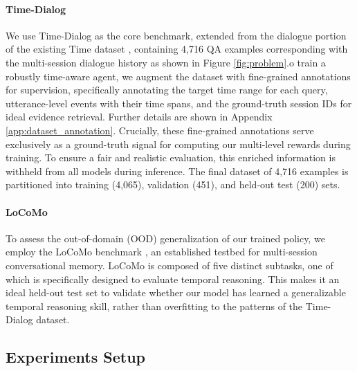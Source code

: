\documentclass{article} %
\begin{document}
\paragraph{Time-Dialog} We use Time-Dialog as the core benchmark, extended from the dialogue portion of the existing Time dataset \citep{wei2025time}, containing 4,716 QA examples corresponding with the multi-session dialogue history as shown in Figure \ref{fig:problem}.o train a robustly time-aware agent, we augment the dataset with fine-grained annotations for supervision, specifically annotating the target time range for each query, utterance-level events with their time spans, and the ground-truth session IDs for ideal evidence retrieval. Further details are shown in Appendix \ref{app:dataset_annotation}.
Crucially, these fine-grained annotations serve exclusively as a ground-truth signal for computing our multi-level rewards during training. To ensure a fair and realistic evaluation, this enriched information is withheld from all models during inference. The final dataset of 4,716 examples is partitioned into training (4,065), validation (451), and held-out test (200) sets.

\paragraph{LoCoMo}  
To assess the out-of-domain (OOD) generalization of our trained policy, we employ the LoCoMo benchmark \citep{maharana-etal-2024-evaluating}, an established testbed for multi-session conversational memory. LoCoMo is composed of five distinct subtasks, one of which is specifically designed to evaluate temporal reasoning. This makes it an ideal held-out test set to validate whether our model has learned a generalizable temporal reasoning skill, rather than overfitting to the patterns of the Time-Dialog dataset.
\subsection{Experiments Setup}
\end{document}
